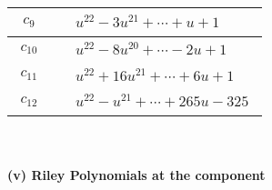 \documentclass[1p]{elsarticle_modified}
\theoremstyle{definition}
\begin{document}
\begin{tabular}{m{50pt}|m{274pt}}
\hline $$\begin{aligned}c_{9}\end{aligned}$$&$\begin{aligned}
&u^{22}-3 u^{21}+\cdots+u+1
\end{aligned}$\\
\hline $$\begin{aligned}c_{10}\end{aligned}$$&$\begin{aligned}
&u^{22}-8 u^{20}+\cdots-2 u+1
\end{aligned}$\\
\hline $$\begin{aligned}c_{11}\end{aligned}$$&$\begin{aligned}
&u^{22}+16 u^{21}+\cdots+6 u+1
\end{aligned}$\\
\hline $$\begin{aligned}c_{12}\end{aligned}$$&$\begin{aligned}
&u^{22}- u^{21}+\cdots+265 u-325
\end{aligned}$\\
\hline
\end{tabular}\\~\\
\newpage\renewcommand{\arraystretch}{1}
\flushleft \textbf{(v) Riley Polynomials at the component}\newline \\
\end{document}
